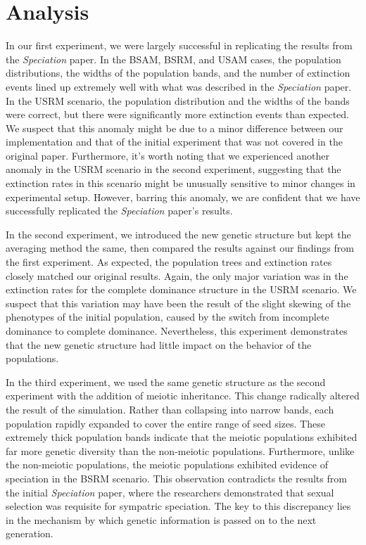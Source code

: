 \documentclass{article}
\begin{document}
\section{Analysis}

In our first experiment, we were largely successful in replicating the results from the \textit{Speciation} paper. In the BSAM, BSRM, and USAM cases, the population distributions, the widths of the population bands, and the number of extinction events lined up extremely well with what was described in the \textit{Speciation} paper. In the USRM scenario, the population distribution and the widths of the bands were correct, but there were significantly more extinction events than expected. We suspect that this anomaly might be due to a minor difference between our implementation and that of the initial experiment that was not covered in the original paper. Furthermore, it’s worth noting that we experienced another anomaly in the USRM scenario in the second experiment, suggesting that the extinction rates in this scenario might be unusually sensitive to minor changes in experimental setup. However, barring this anomaly, we are confident that we have successfully replicated the \textit{Speciation} paper’s results. 

In the second experiment, we introduced the new genetic structure but kept the averaging method the same, then compared the results against our findings from the first experiment. As expected, the population trees and extinction rates closely matched our original results. Again, the only major variation was in the extinction rates for the complete dominance structure in the USRM scenario. We suspect that this variation may have been the result of the slight skewing of the phenotypes of the initial population, caused by the switch from incomplete dominance to complete dominance. Nevertheless, this experiment demonstrates that the new genetic structure had little impact on the behavior of the populations.

In the third experiment, we used the same genetic structure as the second experiment with the addition of meiotic inheritance. This change radically altered the result of the simulation. Rather than collapsing into narrow bands, each population rapidly expanded to cover the entire range of seed sizes. These extremely thick population bands indicate that the meiotic populations exhibited far more genetic diversity than the non-meiotic populations. Furthermore, unlike the non-meiotic populations, the meiotic populations exhibited evidence of speciation in the BSRM scenario. This observation contradicts the results from the initial \textit{Speciation} paper, where the researchers demonstrated that sexual selection was requisite for sympatric speciation. The key to this discrepancy lies in the mechanism by which genetic information is passed on to the next generation. 
\end{document}
